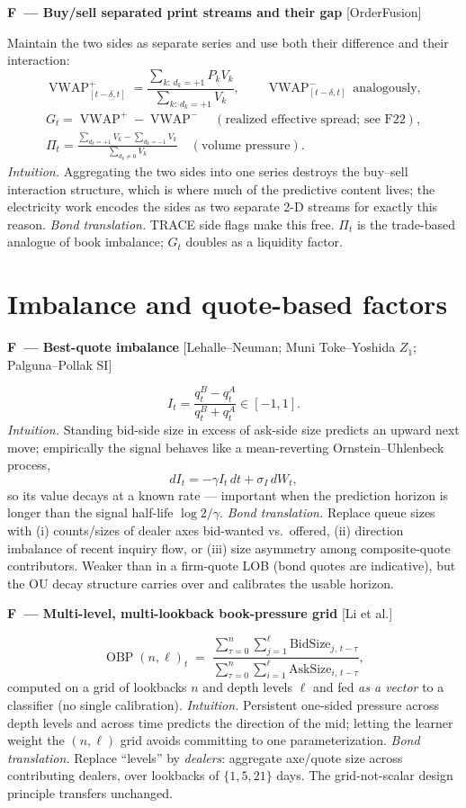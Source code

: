\documentclass[11pt]{article}
\DeclareMathOperator{\VWAP}{VWAP}
\newcounter{fac}
\newcommand{\factor}[2]{%
  \refstepcounter{fac}%
  \par\medskip\noindent\textbf{F\thefac\ --- #1} \hfill {\small[#2]}\par\nopagebreak}
\begin{document}
\factor{Buy/sell separated print streams and their gap}{OrderFusion}
Maintain the two sides as separate series and use both their difference and their interaction:
\[
\VWAP^{+}_{[t-\delta,t]} = \frac{\sum_{k:\,d_k=+1} P_k V_k}{\sum_{k:\,d_k=+1} V_k},
\qquad
\VWAP^{-}_{[t-\delta,t]} \ \text{analogously},
\]
\begin{gather*}
G_t = \VWAP^{+} - \VWAP^{-} \quad (\text{realized effective spread; see F22}),\\
\Pi_t = \frac{\sum_{d_k=+1} V_k - \sum_{d_k=-1} V_k}{\sum_{d_k\neq 0} V_k} \quad (\text{volume pressure}).
\end{gather*}
\emph{Intuition.} Aggregating the two sides into one series destroys the buy--sell interaction structure, which is where much of the predictive content lives; the electricity work encodes the sides as two separate 2-D streams for exactly this reason.
\emph{Bond translation.} TRACE side flags make this free. $\Pi_t$ is the trade-based analogue of book imbalance; $G_t$ doubles as a liquidity factor.

\section{Imbalance and quote-based factors}\label{sec:imb}

\factor{Best-quote imbalance}{Lehalle--Neuman; Muni Toke--Yoshida $Z_1$; Palguna--Pollak SI}
\[
I_t = \frac{q^B_t - q^A_t}{q^B_t + q^A_t} \in [-1,1].
\]
\emph{Intuition.} Standing bid-side size in excess of ask-side size predicts an upward next move; empirically the signal behaves like a mean-reverting Ornstein--Uhlenbeck process,
\[
dI_t = -\gamma I_t\,dt + \sigma_I\, dW_t,
\]
so its value decays at a known rate --- important when the prediction horizon is longer than the signal half-life $\log 2/\gamma$.
\emph{Bond translation.} Replace queue sizes with (i) counts/sizes of dealer axes bid-wanted vs.\ offered, (ii) direction imbalance of recent inquiry flow, or (iii) size asymmetry among composite-quote contributors. Weaker than in a firm-quote LOB (bond quotes are indicative), but the OU decay structure carries over and calibrates the usable horizon.

\factor{Multi-level, multi-lookback book-pressure grid}{Li et al.}
\[
\operatorname{OBP}(n,\ell)_t \;=\;
\frac{\sum_{\tau=0}^{n}\sum_{j=1}^{\ell} \text{BidSize}_{j,\,t-\tau}}
     {\sum_{\tau=0}^{n}\sum_{i=1}^{\ell} \text{AskSize}_{i,\,t-\tau}},
\]
computed on a grid of lookbacks $n$ and depth levels $\ell$ and fed \emph{as a vector} to a classifier (no single calibration).
\emph{Intuition.} Persistent one-sided pressure across depth levels and across time predicts the direction of the mid; letting the learner weight the $(n,\ell)$ grid avoids committing to one parameterization.
\emph{Bond translation.} Replace ``levels'' by \emph{dealers}: aggregate axe/quote size across contributing dealers, over lookbacks of $\{1,5,21\}$ days. The grid-not-scalar design principle transfers unchanged.
\end{document}
